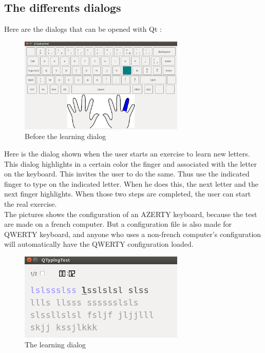 \subsection{The differents dialogs}
Here are the dialogs that can be opened with Qt :

\begin{figure}[H]
	\centering
	\includegraphics[width=0.7\textwidth]{images/dialog-before-learn.png}
	 \caption{Before the learning dialog}
	 \label{dialog-before-learn}
\end{figure}

Here is the dialog shown when the user starts an exercise to learn new letters.\\
This dialog highlights in a certain color the finger and associated with the letter on the keyboard. This invites the user to do the same. Thus use the indicated finger to type on the indicated letter. When he does this, the next letter and the next finger highlights. When those two steps are completed, the user can start the real exercise.\\
The pictures shows the configuration of an AZERTY keyboard, because the test are made on a french computer. But a configuration file is also made for QWERTY keyboard, and anyone who uses a non-french computer's configuration will automatically have the QWERTY configuration loaded.

\begin{figure}[H]
	\centering
	\includegraphics[width=0.7\textwidth]{images/dialog-learn.png}
	 \caption{The learning dialog}
	 \label{dialog-learn}
\end{figure}

